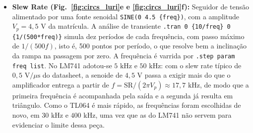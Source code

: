 \documentclass[11pt,a4paper]{article}
\begin{document}
\begin{itemize}
    \item \textbf{Slew Rate (Fig.~\ref{fig:circs_luri}e e \ref{fig:circs_luri}f):} Seguidor de tensão alimentado por uma fonte senoidal \texttt{SINE(0 4.5 \{freq\})}, com a amplitude $V_p=4{,}5\text{ V}$ da matrícula. A análise de transiente \texttt{.tran 0 \{10/freq\} 0 \{1/(500*freq)\}} simula dez períodos de cada frequência, com passo máximo de $1/(500f)$, isto é, 500 pontos por período, o que resolve bem a inclinação da rampa na passagem por zero. A frequência é varrida por \texttt{.step param freq list}. No LM741 adotou-se $5\text{ kHz}$ e $50\text{ kHz}$: com o slew rate típico de $0{,}5\text{ V}/\mu\text{s}$ do datasheet, a senoide de $4{,}5\text{ V}$ passa a exigir mais do que o amplificador entrega a partir de $f=\mathrm{SR}/(2\pi V_p)\approx17{,}7\text{ kHz}$, de modo que a primeira frequência é acompanhada pela saída e a segunda já resulta em triângulo. Como o TL064 é mais rápido, as frequências foram escolhidas de novo, em $30\text{ kHz}$ e $400\text{ kHz}$, uma vez que as do LM741 não servem para evidenciar o limite dessa peça.
\end{itemize}
\end{document}
